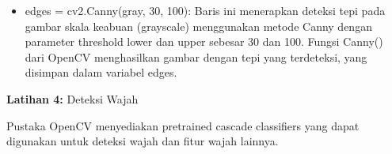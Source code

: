 \documentclass[
  letterpaper,
  DIV=11,
  numbers=noendperiod]{scrreprt}
\providecommand{\tightlist}{%
  \setlength{\itemsep}{0pt}\setlength{\parskip}{0pt}}\usepackage{longtable,booktabs,array}
\begin{document}
\begin{tcolorbox}[enhanced jigsaw, opacityback=0, colbacktitle=quarto-callout-tip-color!10!white, breakable, titlerule=0mm, left=2mm, toptitle=1mm, rightrule=.15mm, leftrule=.75mm, colback=white, opacitybacktitle=0.6, arc=.35mm, toprule=.15mm, coltitle=black, colframe=quarto-callout-tip-color-frame, bottomtitle=1mm, title=\textcolor{quarto-callout-tip-color}{\faLightbulb}\hspace{0.5em}{Penjelasan Kode}, bottomrule=.15mm]

\begin{itemize}
\tightlist
\item
  edges = cv2.Canny(gray, 30, 100): Baris ini menerapkan deteksi tepi
  pada gambar skala keabuan (grayscale) menggunakan metode Canny dengan
  parameter threshold lower dan upper sebesar 30 dan 100. Fungsi Canny()
  dari OpenCV menghasilkan gambar dengan tepi yang terdeteksi, yang
  disimpan dalam variabel edges.\\
\end{itemize}

\end{tcolorbox}

\textbf{Latihan 4:} Deteksi Wajah

Pustaka OpenCV menyediakan pretrained cascade classifiers yang dapat
digunakan untuk deteksi wajah dan fitur wajah lainnya.
\end{document}

